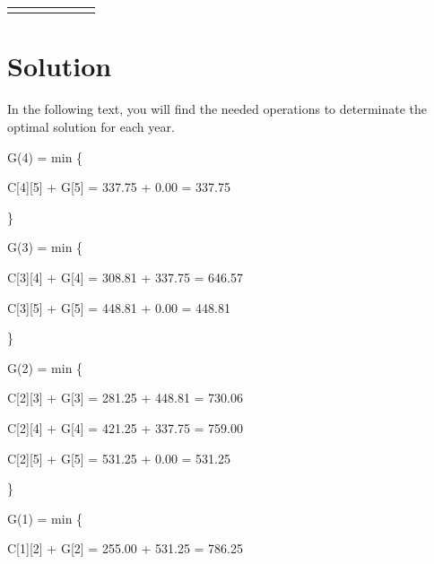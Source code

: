\documentclass{article}
\begin{document}
\begin{center}
\begin{adjustbox}{max width=\textwidth}
\begin{tabular}{|c||c|c|c|c|c|c|}
        \hline
        \cellcolor{DonCangrejo}{\textbf{\textcolor{white}{i=4}}}& \cellcolor{CangrejoInside}{$-$} & \cellcolor{CangrejoInside}{$-$} & \cellcolor{CangrejoInside}{$-$} & \cellcolor{CangrejoInside}{$-$} & \cellcolor{CangrejoInside}{$-$} & \cellcolor{CangrejoInside}{$337.75$ \$}\\
        \hline
        \cellcolor{DonCangrejo}{\textbf{\textcolor{white}{i=5}}}& \cellcolor{CangrejoInside}{$-$} & \cellcolor{CangrejoInside}{$-$} & \cellcolor{CangrejoInside}{$-$} & \cellcolor{CangrejoInside}{$-$} & \cellcolor{CangrejoInside}{$-$} & \cellcolor{CangrejoInside}{$-$} \\
        \hline
    \end{tabular}
\end{adjustbox}


\end{center}



\section{Solution}
In the following text, you will find the needed operations to determinate the optimal solution for each year.

G(4) = min \{ 

\hspace{1cm} C[4][5] + G[5] = 337.75 + 0.00 = 337.75 

 \} 


G(3) = min \{ 

\hspace{1cm} C[3][4] + G[4] = 308.81 + 337.75 = 646.57 

\hspace{1cm} C[3][5] + G[5] = 448.81 + 0.00 = 448.81 

 \} 


G(2) = min \{ 

\hspace{1cm} C[2][3] + G[3] = 281.25 + 448.81 = 730.06 

\hspace{1cm} C[2][4] + G[4] = 421.25 + 337.75 = 759.00 

\hspace{1cm} C[2][5] + G[5] = 531.25 + 0.00 = 531.25 

 \} 


G(1) = min \{ 

\hspace{1cm} C[1][2] + G[2] = 255.00 + 531.25 = 786.25 
\end{document}
